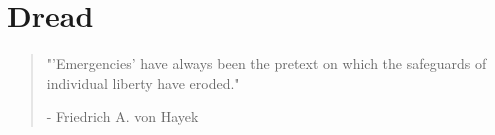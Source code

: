 \chapter{Dread}

\vspace{-1.3cm}
\begin{localsize}{10}
	\begin{quote}
		"'Emergencies' have always been the pretext on which the safeguards of individual liberty have eroded."
		\begin{flushright}- Friedrich A. von Hayek\end{flushright}
	\end{quote} 
\end{localsize}
\vspace{1cm}

